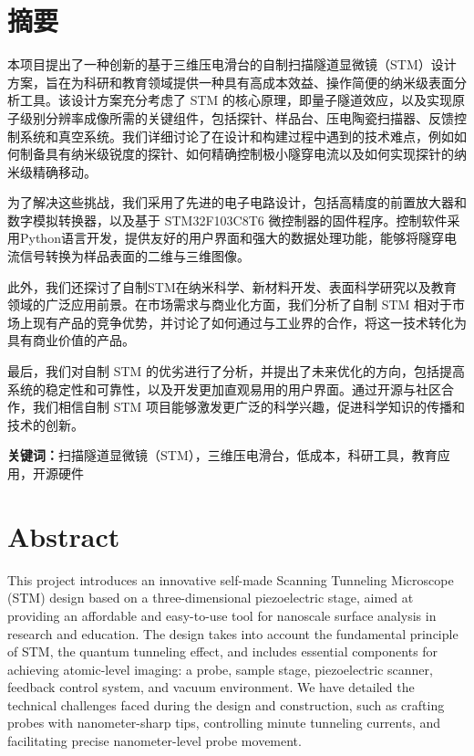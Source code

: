 \documentclass{article}
\begin{document}
\begin{spacing}{1.625}


\xiaosi
\section*{摘要}
	\setParDis %
	本项目提出了一种创新的基于三维压电滑台的自制扫描隧道显微镜（STM）设计方案，旨在为科研和教育领域提供一种具有高成本效益、操作简便的纳米级表面分析工具。该设计方案充分考虑了 STM 的核心原理，即量子隧道效应，以及实现原子级别分辨率成像所需的关键组件，包括探针、样品台、压电陶瓷扫描器、反馈控制系统和真空系统。我们详细讨论了在设计和构建过程中遇到的技术难点，例如如何制备具有纳米级锐度的探针、如何精确控制极小隧穿电流以及如何实现探针的纳米级精确移动。
	
	为了解决这些挑战，我们采用了先进的电子电路设计，包括高精度的前置放大器和数字模拟转换器，以及基于 STM32F103C8T6 微控制器的固件程序。控制软件采用Python语言开发，提供友好的用户界面和强大的数据处理功能，能够将隧穿电流信号转换为样品表面的二维与三维图像。
	
	此外，我们还探讨了自制STM在纳米科学、新材料开发、表面科学研究以及教育领域的广泛应用前景。在市场需求与商业化方面，我们分析了自制 STM 相对于市场上现有产品的竞争优势，并讨论了如何通过与工业界的合作，将这一技术转化为具有商业价值的产品。
	
	最后，我们对自制 STM 的优劣进行了分析，并提出了未来优化的方向，包括提高系统的稳定性和可靠性，以及开发更加直观易用的用户界面。通过开源与社区合作，我们相信自制 STM 项目能够激发更广泛的科学兴趣，促进科学知识的传播和技术的创新。
	


\textbf{关键词：}扫描隧道显微镜（STM），三维压电滑台，低成本，科研工具，教育应用，开源硬件



\newpage
\section*{\textbf{Abstract}} %
	\begin{adjustwidth}{0.42cm}{0.42cm}
		\setParDis %
		
		\qquad This project introduces an innovative self-made Scanning Tunneling Microscope (STM) design based on a three-dimensional piezoelectric stage, aimed at providing an affordable and easy-to-use tool for nanoscale surface analysis in research and education. The design takes into account the fundamental principle of STM, the quantum tunneling effect, and includes essential components for achieving atomic-level imaging: a probe, sample stage, piezoelectric scanner, feedback control system, and vacuum environment. We have detailed the technical challenges faced during the design and construction, such as crafting probes with nanometer-sharp tips, controlling minute tunneling currents, and facilitating precise nanometer-level probe movement.
		

\end{adjustwidth}
\end{spacing}
\end{document}
